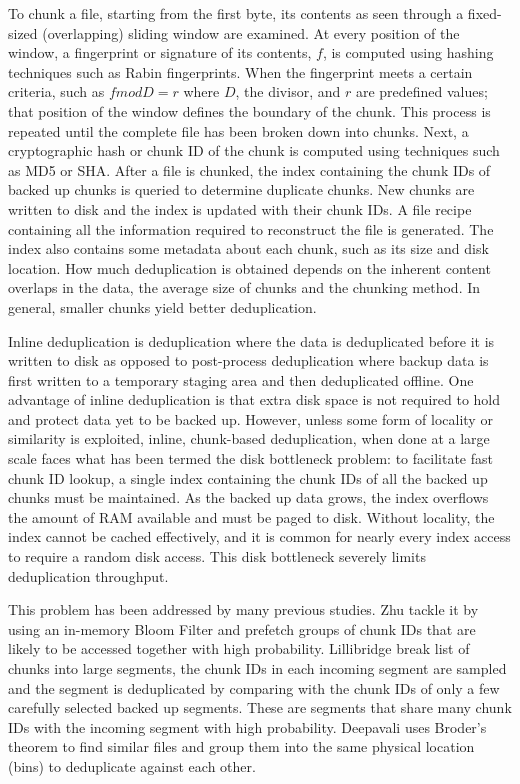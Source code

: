 To chunk a file, starting from the first byte, its contents as seen through a fixed-sized (overlapping) 
sliding window are examined. At every position of the window, a fingerprint or signature of its 
contents, $f$, is computed using hashing techniques such as Rabin fingerprints\cite{rabin81}. 
When the fingerprint meets a certain criteria, such as $f mod D = r$ where $D$, the divisor, 
and $r$ are predefined values; that position of the window defines the boundary of the chunk. 
This process is repeated until the complete file has been broken down into chunks. Next, 
a cryptographic hash or chunk ID of the chunk is computed using techniques such as MD5 or SHA.
After a file is chunked, the index containing the chunk IDs of backed up chunks 
is queried to determine duplicate chunks. New chunks are written to disk and the 
index is updated with their chunk IDs. A file recipe containing all the information 
required to reconstruct the file is generated. The index also contains some metadata 
about each chunk, such as its size and disk location.
How much deduplication is obtained depends on the inherent content overlaps in the data, 
the average size of chunks and the chunking method\cite{poli04}. In general, smaller chunks yield better deduplication.

Inline deduplication is deduplication where the data is deduplicated before 
it is written to disk as opposed to post-process deduplication where backup data 
is first written to a temporary staging area and then deduplicated offline. 
One advantage of inline deduplication is that extra disk space is not required to 
hold and protect data yet to be backed up. 
However, unless some form of locality or similarity is exploited, inline, chunk-based deduplication, 
when done at a large scale faces what has been termed the disk bottleneck problem: to facilitate fast chunk ID lookup, 
a single index containing the chunk IDs of all the backed up chunks must be maintained. 
As the backed up data grows, the index overflows the amount of RAM available and must be paged to disk. 
Without locality, the index cannot be cached effectively, and it is common for nearly 
every index access to require a random disk access. This disk bottleneck severely limits deduplication throughput.

This problem has been addressed by many previous studies. Zhu\cite{bottleneck08} tackle it 
by using an in-memory Bloom Filter and prefetch groups of chunk IDs that are likely to be 
accessed together with high probability. Lillibridge\cite{sparseindex09} break list of chunks 
into large segments, the chunk IDs in each incoming segment are sampled and the segment is 
deduplicated by comparing with the chunk IDs of only a few carefully selected backed up segments. 
These are segments that share many chunk IDs with the incoming segment with high probability.
Deepavali\cite{extreme_binning09} uses Broder's theorem\cite{resemblance97} to find similar files and group them
into the same physical location (bins) to deduplicate against each other.

